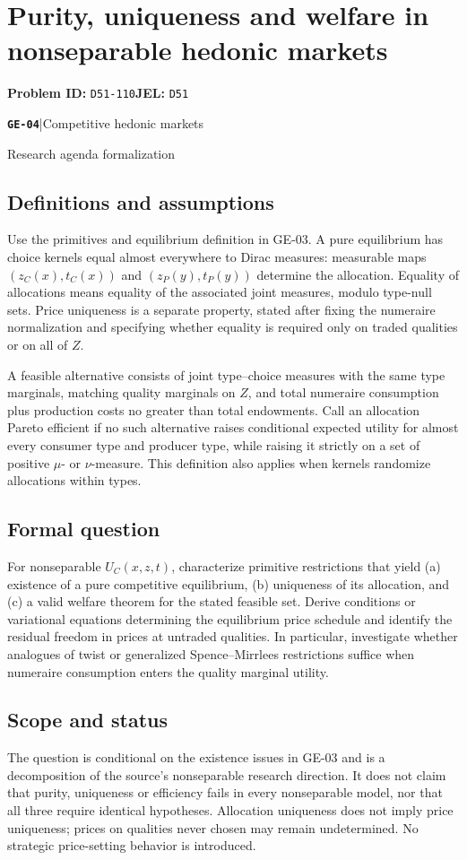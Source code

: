 \documentclass[11pt,a4paper]{article}
\newcommand{\entrymeta}[3]{{\sffamily\small\color{muted}\textbf{\texttt{#1}}\quad|\quad #2\par #3\par}}
\begin{document}
\section*{Purity, uniqueness and welfare in nonseparable hedonic markets}
\textbf{Problem ID:} \texttt{D51-110}\quad \textbf{JEL:} \texttt{D51}\par
\label{problem:OP-0576}
\label{beyond:GE-04}
\entrymeta{GE-04}{Competitive hedonic markets}{Research agenda formalization}
\subsection*{Definitions and assumptions}
Use the primitives and equilibrium definition in GE-03. A pure equilibrium has choice kernels equal almost everywhere to Dirac measures: measurable maps $(z_C(x),t_C(x))$ and $(z_P(y),t_P(y))$ determine the allocation. Equality of allocations means equality of the associated joint measures, modulo type-null sets. Price uniqueness is a separate property, stated after fixing the numeraire normalization and specifying whether equality is required only on traded qualities or on all of $Z$.

A feasible alternative consists of joint type--choice measures with the same type marginals, matching quality marginals on $Z$, and total numeraire consumption plus production costs no greater than total endowments. Call an allocation Pareto efficient if no such alternative raises conditional expected utility for almost every consumer type and producer type, while raising it strictly on a set of positive $\mu$- or $\nu$-measure. This definition also applies when kernels randomize allocations within types.
\subsection*{Formal question}
For nonseparable $U_C(x,z,t)$, characterize primitive restrictions that yield (a) existence of a pure competitive equilibrium, (b) uniqueness of its allocation, and (c) a valid welfare theorem for the stated feasible set. Derive conditions or variational equations determining the equilibrium price schedule and identify the residual freedom in prices at untraded qualities. In particular, investigate whether analogues of twist or generalized Spence--Mirrlees restrictions suffice when numeraire consumption enters the quality marginal utility.
\subsection*{Scope and status}
The question is conditional on the existence issues in GE-03 and is a decomposition of the source's nonseparable research direction. It does not claim that purity, uniqueness or efficiency fails in every nonseparable model, nor that all three require identical hypotheses. Allocation uniqueness does not imply price uniqueness; prices on qualities never chosen may remain undetermined. No strategic price-setting behavior is introduced.
\end{document}
